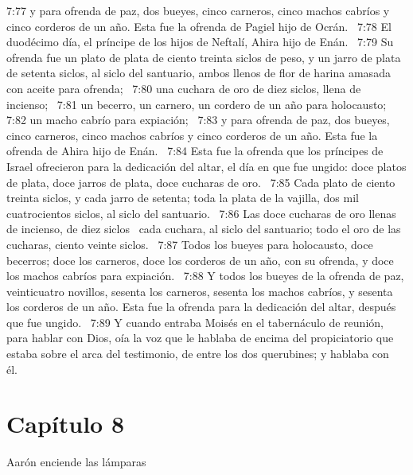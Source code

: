 7:77 y para ofrenda de paz, dos bueyes, cinco carneros, cinco machos cabríos y cinco corderos de un año. Esta fue la ofrenda de Pagiel hijo de Ocrán.  
7:78 El duodécimo día, el príncipe de los hijos de Neftalí, Ahira hijo de Enán.  
7:79 Su ofrenda fue un plato de plata de ciento treinta siclos de peso, y un jarro de plata de setenta siclos, al siclo del santuario, ambos llenos de flor de harina amasada con aceite para ofrenda;  
7:80 una cuchara de oro de diez siclos, llena de incienso;  
7:81 un becerro, un carnero, un cordero de un año para holocausto;  
7:82 un macho cabrío para expiación;  
7:83 y para ofrenda de paz, dos bueyes, cinco carneros, cinco machos cabríos y cinco corderos de un año. Esta fue la ofrenda de Ahira hijo de Enán.  
7:84 Esta fue la ofrenda que los príncipes de Israel ofrecieron para la dedicación del altar, el día en que fue ungido: doce platos de plata, doce jarros de plata, doce cucharas de oro.  
7:85 Cada plato de ciento treinta siclos, y cada jarro de setenta; toda la plata de la vajilla, dos mil cuatrocientos siclos, al siclo del santuario.  
7:86 Las doce cucharas de oro llenas de incienso, de diez siclos  cada cuchara, al siclo del santuario; todo el oro de las cucharas, ciento veinte siclos.  
7:87 Todos los bueyes para holocausto, doce becerros; doce los carneros, doce los corderos de un año, con su ofrenda, y doce los machos cabríos para expiación.  
7:88 Y todos los bueyes de la ofrenda de paz, veinticuatro novillos, sesenta los carneros, sesenta los machos cabríos, y sesenta los corderos de un año. Esta fue la ofrenda para la dedicación del altar, después que fue ungido.  
7:89 Y cuando entraba Moisés en el tabernáculo de reunión, para hablar con Dios, oía la voz que le hablaba de encima del propiciatorio que estaba sobre el arca del testimonio, de entre los dos querubines; y hablaba con él.  
\section*{Capítulo 8}
Aarón enciende las lámparas  

